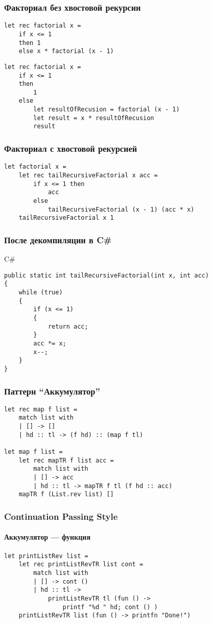 \documentclass[xetex,mathserif,serif]{beamer}
\begin{document}
	\begin{frame}[fragile]
		\frametitle{Факториал без хвостовой рекурсии}
		\begin{verbatim}
let rec factorial x =
    if x <= 1
    then 1 
    else x * factorial (x - 1)
		\end{verbatim}

		\begin{verbatim}
let rec factorial x =
    if x <= 1
    then
        1
    else
        let resultOfRecusion = factorial (x - 1)
        let result = x * resultOfRecusion
        result
		\end{verbatim}
	\end{frame}

	\begin{frame}[fragile]
		\frametitle{Факториал с хвостовой рекурсией}
		\begin{verbatim}
let factorial x =
    let rec tailRecursiveFactorial x acc =
        if x <= 1 then
            acc
        else
            tailRecursiveFactorial (x - 1) (acc * x)
    tailRecursiveFactorial x 1
		\end{verbatim}
	\end{frame}
	
	\begin{frame}[fragile]
		\frametitle{После декомпиляции в C\#}
		\begin{alertblock}{C\#}
			\begin{verbatim}
public static int tailRecursiveFactorial(int x, int acc)
{
    while (true)
    {
        if (x <= 1)
        {
            return acc;
        }
        acc *= x;
        x--;
    }
}
			\end{verbatim}
		\end{alertblock}
	\end{frame}

	\begin{frame}[fragile]
		\frametitle{Паттерн ``Аккумулятор''}
		\begin{verbatim}
let rec map f list =
    match list with
    | [] -> []
    | hd :: tl -> (f hd) :: (map f tl)

let map f list =
    let rec mapTR f list acc =
        match list with
        | [] -> acc
        | hd :: tl -> mapTR f tl (f hd :: acc)
    mapTR f (List.rev list) []
		\end{verbatim}
	\end{frame}

	\begin{frame}[fragile]
		\frametitle{Continuation Passing Style}
		\framesubtitle{Аккумулятор --- функция}
		\begin{verbatim}
let printListRev list =
    let rec printListRevTR list cont =
        match list with
        | [] -> cont ()
        | hd :: tl ->
            printListRevTR tl (fun () -> 
                printf "%d " hd; cont () )
    printListRevTR list (fun () -> printfn "Done!")
		\end{verbatim}
	\end{frame}
\end{document}

